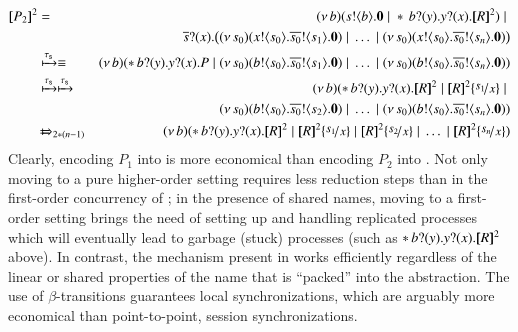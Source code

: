 \documentclass[preprint,11pt]{elsarticle}
\begin{document}
{{\begin{eqnarray*}
\pmap{P_2}{2} & = & 	\newsp{b}{\bout{s}{b} \inact \Par \repl \binp{b}{y} \binp{y}{x} \pmap{R}{2}} \Par \\
& & \qquad \qquad \binp{\dual{s}}{x} \big(\newsp{s_0}{\bout{x}{s_0} \bout{\dual{s_0}}{s_1} \inact} \Par \dots \Par \newsp{s_0}{\bout{x}{s_0} \bout{\dual{s_0}}{s_n}\inact}\big)
	\\
	& \hby{\stau} \equiv & 
	\newsp{b}{\repl \binp{b}{y} \binp{y}{x} P \Par \newsp{s_0}{\bout{b}{s_0} \bout{\dual{s_0}}{s_1} \inact} \Par \dots \Par \newsp{s_0}{\bout{b}{s_0} \bout{\dual{s_0}}{s_n} \inact}}
	\\
	& \hby{\stau}  \hby{\stau}   & 
	\newsp{b}{\repl \binp{b}{y} \binp{y}{x} \pmap{R}{2} \Par \pmap{R}{2}\subst{s_1}{x} \Par 
	\\
	&  & \qquad \qquad \newsp{s_0}{\bout{b}{s_0} \bout{\dual{s_0}}{s_2} \inact} \Par \dots \Par \newsp{s_0}{\bout{b}{s_0} \bout{\dual{s_0}}{s_n} \inact}}
	\\
	& \Hby{}_{2*(n - 1)} & 
	\newsp{b}{\repl \binp{b}{y} \binp{y}{x} \pmap{R}{2} \Par \pmap{R}{2}\subst{s_1}{x} \Par \pmap{R}{2}\subst{s_2}{x} \Par \dots \Par \pmap{R}{2}\subst{s_n}{x}}
\end{eqnarray*}
Clearly, encoding $P_1$ into \HO is more economical than 
encoding $P_2$ into \sessp. Not only moving to a pure higher-order setting requires less reduction steps than in the first-order concurrency of \sessp; in the presence of shared names, moving to a first-order setting brings the need of setting up and handling replicated processes which will eventually lead to garbage (stuck) processes (such as $\ast\, b ? (y) . y ? (x) . [\!\![R]\!\!]^2$ above). In contrast, the mechanism present in \HO works efficiently regardless of the linear or shared properties of the name that is ``packed'' into the abstraction. 
The use of $\beta$-transitions guarantees local synchronizations, which are arguably more economical than point-to-point, session synchronizations.

}}
\end{document}
